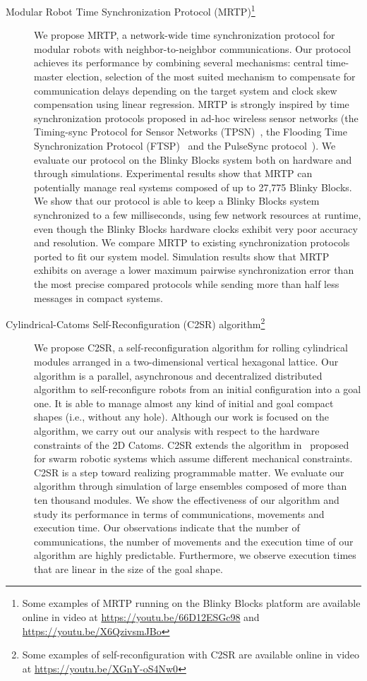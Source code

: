 \begin{description}
	\item [Modular Robot Time Synchronization Protocol (MRTP)\footnote{Some examples of MRTP running on the Blinky Blocks platform are available online in video at \url{https://youtu.be/66D12ESGc98} and \url{https://youtu.be/X6QzivsmJBo}}] We propose MRTP, a network-wide time synchronization protocol for modular robots with neighbor-to-neighbor communications. Our protocol achieves its performance by combining several mechanisms: central time-master election, selection of the most suited mechanism to compensate for communication delays depending on the target system and clock skew compensation using linear regression. MRTP is strongly inspired by time synchronization protocols proposed in ad-hoc wireless sensor networks (the Timing-sync Protocol for Sensor Networks (TPSN)~\cite{ganeriwal2003timing}, the Flooding Time Synchronization Protocol (FTSP)~\cite{maroti2004flooding} and the PulseSync protocol~\cite{lenzen2009optimal}). We evaluate our protocol on the Blinky Blocks system both on hardware and through simulations. Experimental results show that MRTP can potentially manage real systems composed of up to 27,775 Blinky Blocks. We show that our protocol is able to keep a Blinky Blocks system synchronized to a few milliseconds, using few network resources at runtime, even though the Blinky Blocks hardware clocks exhibit very poor accuracy and resolution. We compare MRTP to existing synchronization protocols ported to fit our system model. Simulation results show that MRTP exhibits on average a lower maximum pairwise synchronization error than the most precise compared protocols while sending more than half less messages in compact systems.
	\item [Cylindrical-Catoms Self-Reconfiguration (C2SR) algorithm\footnote{Some examples of self-reconfiguration with C2SR are available online in video at \url{https://youtu.be/XGnY-oS4Nw0}}] We propose C2SR, a self-reconfiguration algorithm for rolling cylindrical modules arranged in a two-dimensional vertical hexagonal lattice. Our algorithm is a parallel, asynchronous and decentralized distributed algorithm to self-reconfigure robots from an initial configuration into a goal one. It is able to manage almost any kind of initial and goal compact shapes (i.e., without any hole). Although our work is focused on the algorithm, we carry out our analysis with respect to the hardware constraints of the 2D Catoms. C2SR extends the algorithm in~\cite{rubenstein2014programmable} proposed for swarm robotic systems which assume different mechanical constraints. C2SR is a step toward realizing programmable matter. We evaluate our algorithm through simulation of large ensembles composed of more than ten thousand modules. We show the effectiveness of our algorithm and study its performance in terms of communications, movements and execution time. Our observations indicate that the number of communications, the number of movements and the execution time of our algorithm are highly predictable. Furthermore, we observe execution times that are linear in the size of the goal shape.
\end{description}

